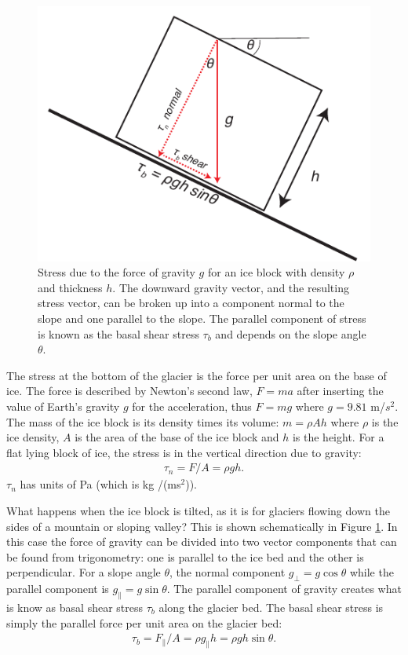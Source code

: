 \documentclass[11pt, oneside]{article}   	%
\begin{document}
\begin{figure}[htbp]
\begin{center}
\includegraphics[width=.6\textwidth]{basal.pdf}
\caption{Stress due to the force of gravity $g$ for an ice block with density $\rho$ and thickness $h$.  The downward gravity vector, and the resulting stress vector, can be broken up into a component normal to the slope and one parallel to the slope. The parallel component of stress is known as the basal shear stress $\tau_b$ and depends on the slope angle $\theta$.}
\label{fig:Basal}
\end{center}
\end{figure}

The stress at the bottom of the glacier is the force per unit area on the base of ice.   The force is described by Newton's second law, $F= m a$ after inserting the value of Earth's gravity $g$ for the acceleration, thus $F=mg$ where  $g = 9.81$ m/$s^2$. The mass of the ice block is its density times its volume: $m = \rho A h$ where $\rho$ is the ice density, $A$ is the area of the base of the ice block and $h$ is the height.  For a flat lying block of ice, the stress is in the vertical direction due to gravity:
\begin{eqnarray}
	\tau_n = F/A =\rho g h.
\end{eqnarray}
$\tau_n $  has units of Pa (which is kg /(ms$^2$)).

What happens when the ice block is tilted, as it is for glaciers flowing down the sides of a mountain or sloping valley? This is shown schematically in Figure \ref{fig:Basal}. In this case the force of gravity can be divided into two vector components that can be found from trigonometry: one is  parallel to the ice bed and the other  is perpendicular.    For a slope angle $\theta$, the normal component $g_\perp = g \cos \theta$ while the parallel component is $g_\parallel = g \sin \theta$.   The parallel component of gravity  creates what is know as basal shear stress $\tau_b$ along the glacier bed. The basal shear stress is simply the parallel force per unit area on the glacier bed:
\begin{eqnarray}
	\tau_b = F_\parallel/A =\rho g_\parallel h = \rho g h \sin \theta.
	\label{eq:taub}
\end{eqnarray}
\end{document}
